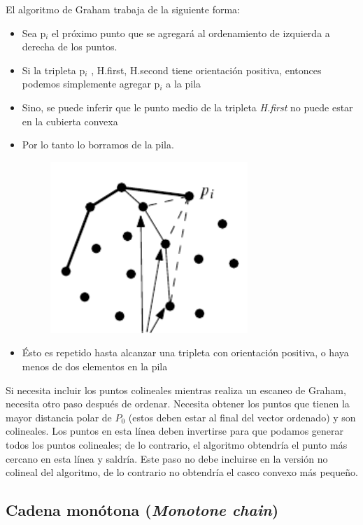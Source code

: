 El algoritmo de Graham trabaja de la siguiente forma: 
\begin{itemize}
	\item Sea p$_{i}$  el próximo punto que se agregará al ordenamiento de izquierda a derecha de los puntos.
	\item Si la tripleta { p$_{i}$ , H.first, H.second } tiene orientación positiva, entonces podemos simplemente agregar  p$_{i}$ a la pila
	\item Sino, se puede inferir que le punto medio de la tripleta {\em H.first} no puede estar en la cubierta convexa
	\item Por lo tanto lo borramos de la pila.
	
	\begin{figure}[!h]
		\centering
		\includegraphics[scale=0.4]{img/cubierta_convexa5}
	\end{figure} 
	\item Ésto es repetido hasta alcanzar una tripleta con orientación positiva, o haya menos de dos elementos en la pila
	
\end{itemize}



Si necesita incluir los puntos colineales mientras realiza un escaneo de Graham, necesita otro paso después de ordenar. Necesita obtener los puntos que tienen la mayor distancia polar de $P_0$ (estos deben estar al final del vector ordenado) y son colineales. Los puntos en esta línea deben invertirse para que podamos generar todos los puntos colineales; de lo contrario, el algoritmo obtendría el punto más cercano en esta línea y saldría. Este paso no debe incluirse en la versión no colineal del algoritmo, de lo contrario no obtendría el casco convexo más pequeño.

\subsection{Cadena monótona (\emph{Monotone chain})}

